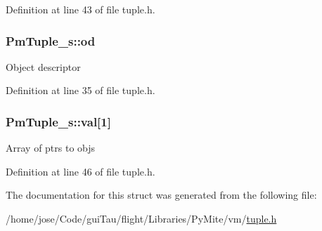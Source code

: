Definition at line 43 of file tuple.\-h.

\hypertarget{struct_pm_tuple__s_a851e65283535fbe9e7025444210badab}{
\subsubsection[{od}]{ Pm\-Tuple\-\_\-s\-::od}}\label{struct_pm_tuple__s_a851e65283535fbe9e7025444210badab}
Object descriptor 

Definition at line 35 of file tuple.\-h.

\hypertarget{struct_pm_tuple__s_a63378a6cdefc6c883e4cc0c743a5df95}{
\subsubsection[{val}]{ Pm\-Tuple\-\_\-s\-::val\mbox{[}1\mbox{]}}}\label{struct_pm_tuple__s_a63378a6cdefc6c883e4cc0c743a5df95}
Array of ptrs to objs 

Definition at line 46 of file tuple.\-h.



The documentation for this struct was generated from the following file\-:\begin{DoxyCompactItemize}
\item 
/home/jose/\-Code/gui\-Tau/flight/\-Libraries/\-Py\-Mite/vm/\hyperlink{tuple_8h}{tuple.\-h}\end{DoxyCompactItemize}
